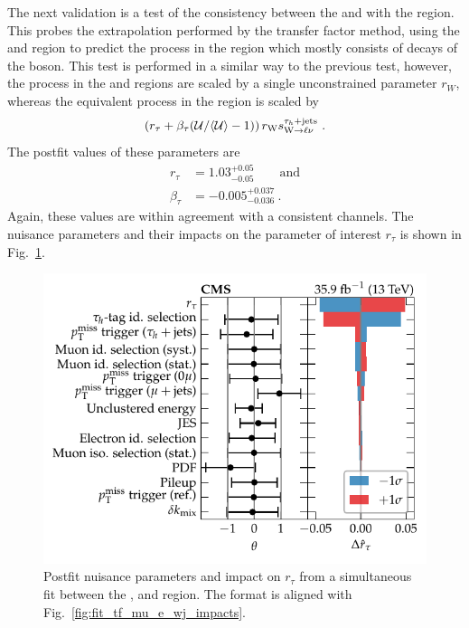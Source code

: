 The next validation is a test of the consistency between the \muplusjets and \eleplusjets with the \tauplusjets region. This probes the extrapolation performed by the transfer factor method, using the \muplusjets and \eleplusjets region to predict the \IWj process in the \metplusjets region which mostly consists of \Ptauh decays of the \PW boson. This test is performed in a similar way to the previous test, however, the \IWj process in the \muplusjets and \eleplusjets regions are scaled by a single unconstrained parameter $r_W$, whereas the equivalent process in the \tauplusjets region is scaled by
%
\begin{equation}
    \left(r_\tau + \beta_\tau (\mathcal{U}/\langle \mathcal{U} \rangle - 1)\right) r_\PW s_{\IWlv}^{\tauplusjets}\ .
\end{equation}
%
The postfit values of these parameters are
%
\begin{align}
    r_\tau & = 1.03^{+0.05}_{-0.05}\qquad\mathrm{and} \nonumber\\
    \beta_\tau & = -0.005^{+0.037}_{-0.036}\ .
\end{align}
%
Again, these values are within agreement with a consistent \eleplusjets channels. The nuisance parameters and their impacts on the parameter of interest $r_\tau$ is shown in Fig.~\ref{fig:fit_tf_mue_t_wj_impacts}.
%
\begin{figure}[htb]
    \centering
    \includegraphics{chapters/042_backgrounds/images/impacts_tfmue2twj.pdf}
    \caption[Nuisance parameters from a fit with the transfer factor method from the muon and electron control regions to the $\tau$-lepton validation region.]{
        Postfit nuisance parameters and impact on $r_\tau$ from a simultaneous fit between the \muplusjets, \eleplusjets and \tauplusjets region. The format is aligned with Fig.~\ref{fig:fit_tf_mu_e_wj_impacts}.
    }
    \label{fig:fit_tf_mue_t_wj_impacts}
\end{figure}

